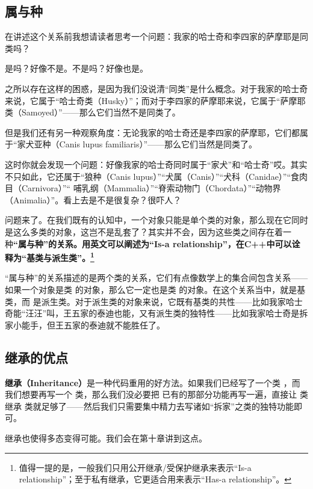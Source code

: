 \subsection*{属与种}
在讲述这个关系前我想请读者思考一个问题：我家的哈士奇和李四家的萨摩耶是同类吗？\par
是吗？好像不是。不是吗？好像也是。\par
之所以存在这样的困惑，是因为我们没说清``同类''是什么概念。对于我家的哈士奇来说，它属于``哈士奇类（Husky）''；而对于李四家的萨摩耶来说，它属于``萨摩耶类（Samoyed）''——那么它们当然不是同类了。\par
但是我们还有另一种观察角度：无论我家的哈士奇还是李四家的萨摩耶，它们都属于``家犬亚种（Canis lupus familiaris）''——那么它们当然是同类了。\par
这时你就会发现一个问题：好像我家的哈士奇同时属于``家犬''和``哈士奇''哎。其实不只如此，它还属于``狼种（Canis lupus）''``犬属（Canis）''``犬科（Canidae）''``食肉目（Carnivora）''``	哺乳纲（Mammalia）''``脊索动物门（Chordata）''``动物界（Animalia）''。看上去是不是很复杂？很吓人？\par
问题来了。在我们既有的认知中，一个对象只能是单个类的对象，那么现在它同时是这么多类的对象，这岂不是乱套了？其实并不会，因为这些类之间存在着一种\textbf{``属与种''的关系。用英文可以阐述为``Is-a relationship''，在C++中可以诠释为``基类与派生类''。\footnote{值得一提的是，一般我们只用公开继承/受保护继承来表示``Is-a relationship''；至于私有继承，它更适合用来表示``Has-a relationship''。}}\par
``属与种''的关系描述的是两个类的关系，它们有点像数学上的集合间包含关系——如果一个对象是类 \lstinline@A@ 的对象，那么它一定也是类 \lstinline@B@ 的对象。在这个关系当中，\lstinline@A@ 就是基类，而 \lstinline@B@ 是派生类。对于派生类的对象来说，它既有基类的共性——比如我家哈士奇能``汪汪''叫，王五家的泰迪也能，又有派生类的独特性——比如我家哈士奇是拆家小能手，但王五家的泰迪就不能胜任了。\par
\subsection*{继承的优点}
\textbf{继承（Inheritance）}是一种代码重用的好方法。如果我们已经写了一个类 \lstinline@Dog@，而我们想要再写一个 \lstinline@Husky@ 类，那么我们没必要把 \lstinline@Dog@ 已有的那部分功能再写一遍，直接让 \lstinline@Husky@ 类继承 \lstinline@Dog@ 类就足够了——然后我们只需要集中精力去写诸如``拆家''之类的独特功能即可。\par
继承也使得多态变得可能。我们会在第十章讲到这点。\par
